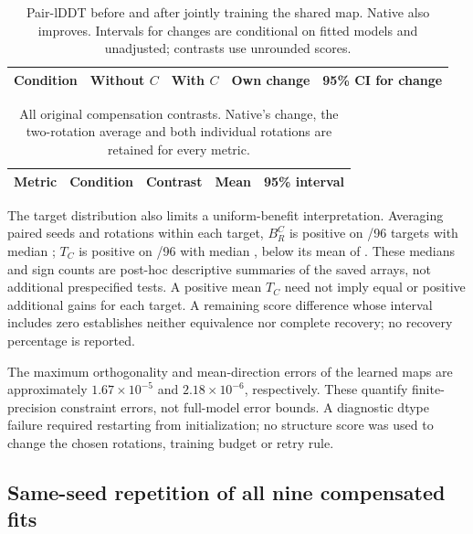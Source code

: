 \clearpage
\begin{table}[!htbp]\centering\small
\caption{Pair-lDDT before and after jointly training the shared map. Native
also improves. Intervals for changes are conditional on fitted models and
unadjusted; contrasts use unrounded scores.}
\begin{tabular}{lrrrr}\toprule
Condition & Without $C$ & With $C$ & Own change & 95\% CI for change \\\midrule

\end{tabular}\end{table}

\begin{table}[!htbp]\centering\footnotesize
\caption{All original compensation contrasts. Native's change, the two-rotation
average and both individual rotations are retained for every metric.}
\begin{tabular}{lllll}\toprule
Metric & Condition & Contrast & Mean & 95\% interval \\\midrule

\end{tabular}\end{table}

The target distribution also limits a uniform-benefit interpretation. Averaging
paired seeds and rotations within each target, $B_R^{C}$ is positive on
/96 targets with median
; $T_C$ is positive on
/96 with median ,
below its mean of . These medians and sign counts are
post-hoc descriptive summaries of the saved arrays, not additional
prespecified tests. A positive mean $T_C$ need not imply equal or positive
additional gains for each target. A remaining score difference whose interval includes zero establishes
neither equivalence nor complete recovery; no recovery percentage is reported.

The maximum orthogonality and mean-direction errors of the learned maps are
approximately $1.67\times10^{-5}$ and $2.18\times10^{-6}$, respectively.
These quantify finite-precision constraint errors, not full-model error bounds.
A diagnostic dtype failure required restarting from initialization; no structure
score was used to change the chosen rotations, training budget or retry rule.

\subsection{Same-seed repetition of all nine compensated fits}
\label{app:e2_repeat}


